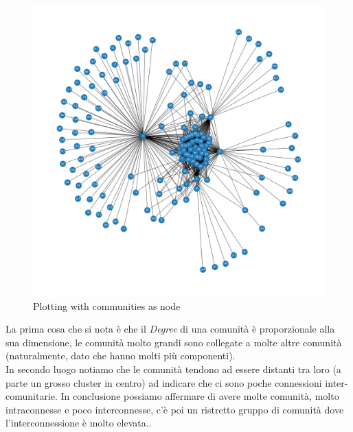 \documentclass[a4paper]{article}
\begin{document}
\begin{figure}[!ht]
\centering
\includegraphics[width=1\textwidth]{cummunity_plot.png}
\caption{Plotting with communities as node} \label{FIG:communities_plot}
\end{figure}
La prima cosa che si nota è che il \textit{Degree} di una comunità è proporzionale alla sua dimensione, le comunità molto grandi sono collegate a molte altre comunità (naturalmente, dato che hanno molti più componenti).\\
In secondo luogo notiamo che le comunità tendono ad essere distanti tra loro (a parte un grosso cluster in centro) ad indicare che ci sono poche connessioni inter-comunitarie.
In conclusione possiamo affermare di avere molte comunità, molto intraconnesse e poco interconnesse, c'è poi un ristretto gruppo di comunità dove l'interconnessione è molto elevata..
\end{document}
